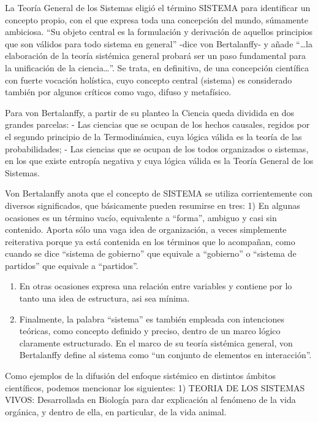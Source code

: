 \documentclass[
]{book}
\begin{document}
La Teoría General de los Sistemas eligió el término SISTEMA para identificar un concepto propio, con el que expresa toda una concepción del mundo, súmamente ambiciosa. ``Su objeto central es la formulación y derivación de aquellos principios que son válidos para todo sistema en general'' -dice von Bertalanffy- y añade ``\ldots la elaboración de la teoría sistémica general probará ser un paso fundamental para la unificación de la ciencia\ldots{}''. Se trata, en definitiva, de una concepción científica con fuerte vocación holística, cuyo concepto central (sistema) es considerado también por algunos críticos como vago, difuso y metafísico.

Para von Bertalanffy, a partir de su planteo la Ciencia queda dividida en dos grandes parcelas: - Las ciencias que se ocupan de los hechos causales, regidos por el segundo principio de la Termodinámica, cuya lógica válida es la teoría de las probabilidades; - Las ciencias que se ocupan de los todos organizados o sistemas, en los que existe entropía negativa y cuya lógica válida es la Teoría General de los Sistemas.

Von Bertalanffy anota que el concepto de SISTEMA se utiliza corrientemente con diversos significados, que básicamente pueden resumirse en tres: 1) En algunas ocasiones es un término vacío, equivalente a ``forma'', ambiguo y casi sin contenido. Aporta sólo una vaga idea de organización, a veces simplemente reiterativa porque ya está contenida en los términos que lo acompañan, como cuando se dice ``sistema de gobierno'' que equivale a ``gobierno'' o ``sistema de partidos'' que equivale a ``partidos''.

\begin{enumerate}
\def\labelenumi{\arabic{enumi})}
\setcounter{enumi}{1}
\item
  En otras ocasiones expresa una relación entre variables y contiene por lo tanto una idea de estructura, asi sea mínima.
\item
  Finalmente, la palabra ``sistema'' es también empleada con intenciones teóricas, como concepto definido y preciso, dentro de un marco lógico claramente estructurado. En el marco de su teoría sistémica general, von Bertalanffy define al sistema como ``un conjunto de elementos en interacción''.
\end{enumerate}

Como ejemplos de la difusión del enfoque sistémico en distintos ámbitos científicos, podemos mencionar los siguientes: 1) TEORIA DE LOS SISTEMAS VIVOS: Desarrollada en Biología para dar explicación al fenómeno de la vida orgánica, y dentro de ella, en particular, de la vida animal.
\end{document}
